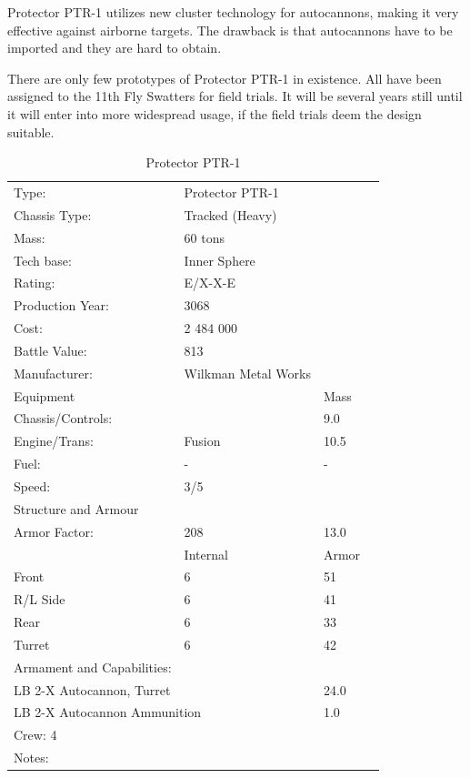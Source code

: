 \documentclass{tufte-book}
\begin{document}
 Protector PTR-1 utilizes new cluster
technology for autocannons, making it very effective against airborne targets.
The drawback is that autocannons have to be imported and they are hard to
obtain.

There are only few prototypes of Protector PTR-1 in existence. All have been
assigned to the 11th Fly Swatters for field trials. It will be several years
still until it will enter into more widespread usage, if the field trials deem
the design suitable.

\bigskip
\begin{table}
\begin{minipage}{\textwidth}
\begin{center}
\begin{tabular}{llll}
\toprule
Type: & Protector PTR-1 & \\
Chassis Type: & Tracked (Heavy) & \\
Mass: & 60 tons & \\
Tech base: & Inner Sphere & \\
Rating: & E/X-X-E & \\
Production Year: & 3068 & \\
Cost: & 2 484 000 & \\
Battle Value: & 813 & \\
Manufacturer: & Wilkman Metal Works & \\
Equipment & & Mass \\
\quad Chassis/Controls: & & 9.0 \\
\quad Engine/Trans: & Fusion & 10.5 \\
\quad Fuel: & - & - \\
\quad Speed: & \multicolumn{2}{l}{3/5} \\
Structure and Armour & & \\
\quad Armor Factor: & 208 & 13.0 \\
\quad & Internal & Armor \\
\quad Front & 6 & 51 \\
\quad R/L Side & 6 & 41 \\
\quad Rear & 6 & 33 \\
\quad Turret & 6 & 42 \\

Armament and Capabilities: & & \\
\multicolumn{2}{l}{\quad 4 LB 2-X Autocannon, Turret} & 24.0 \\
\multicolumn{2}{l}{\quad LB 2-X Autocannon Ammunition} & 1.0 \\


\multicolumn{3}{l}{Crew: 4} \\

Notes: & & \\


\bottomrule
\end{tabular}
\end{center}
\end{minipage}
\caption{Protector PTR-1}
\end{table}
\end{document}
